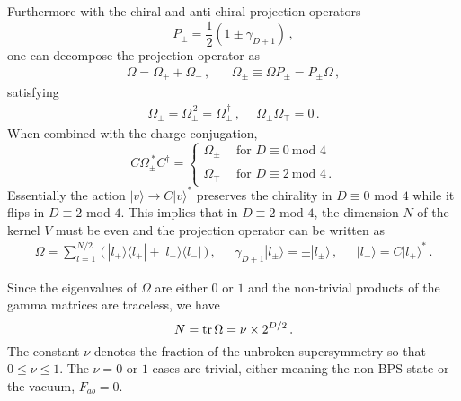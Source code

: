 \documentclass[a4paper,11pt]{article}
\newcommand{\const}{{\nu}}
\def\tr{{\rm tr}}
\def\const{{\nu}}
\begin{document}
Furthermore with  the chiral and anti-chiral projection operators
\begin{equation}
P_{\pm}=\frac{1}{2}(1\pm\gamma_{D+1})\,,
\end{equation}
one can decompose the projection operator as
\begin{equation}
\begin{array}{cc}
\Omega=\Omega_{+}+\Omega_{-}\,,~~&~~\Omega_{\pm}\equiv\Omega P_{\pm}=P_{\pm}\Omega\,,
\end{array}
\label{decom}
\end{equation}
satisfying
\begin{equation}
\begin{array}{ll}
\Omega_{\pm}=\Omega_{\pm}^{\,2}=\Omega_{\pm}^{\,\dagger}\,,~&~\Omega_{\pm}\Omega_{\mp}=0\,.
\end{array}
\end{equation}
When combined with the charge conjugation,
\begin{equation}
C\Omega_{\pm}^{~\ast}C^{\dagger}=\left\{\begin{array}{ll} \Omega_{\pm}&~~\mbox{for~}D\equiv 0~\mbox{mod~}4\\
{}&{}\\ \Omega_{\mp}&~~\mbox{for~}D\equiv 2~\mbox{mod~}4\,.
\end{array}\right.
\label{D24}
\end{equation}
Essentially the action $|v\rangle\rightarrow C|v\rangle^{\ast}$ preserves the chirality in $D\equiv 0$ mod $4$ while it flips in $D\equiv 2$ mod $4$.
This implies that in $D\equiv 2$ mod $4$, the dimension $N$ of the kernel $V$ must be even and the projection operator can be written as
\begin{equation}
\begin{array}{ccc}
\Omega=\displaystyle{\sum_{l=1}^{N/2}}\, \big(\, |l_{+}\rangle\langle l_{+}|+|l_{-}\rangle\langle l_{-}|\, \big)
\,,~~&~\gamma_{D+1}|l_{\pm}\rangle=\pm|l_{\pm}\rangle\,,~~&~|l_{-}\rangle=C|l_{+}\rangle^{\ast}\,.
\end{array}
\label{D=2}
\end{equation}


Since the eigenvalues of $\Omega$ are either $0$ or $1$ and the non-trivial products of the gamma matrices are traceless, we have
\begin{equation}
N=\tr\,\Omega=\const\times 2^{D/2}\,.
\end{equation}
The constant $\const$ denotes the fraction of the unbroken supersymmetry so that $0\leq\nu\leq 1$. The $\const=0$ or $1$ cases are trivial, either
meaning the non-BPS state or the vacuum, $F_{ab}=0$.
\end{document}
